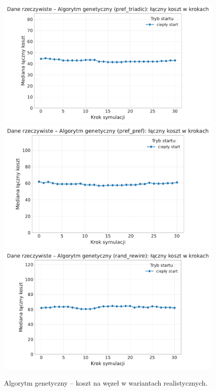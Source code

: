 \begin{figure}[H]
  \centering
  \includegraphics[width=0.62\linewidth]{assets/figures/dynamic/real/real_algorytm_genetyczny_cost_over_steps_pref_triadic.pdf}\\[0.4em]
  \includegraphics[width=0.62\linewidth]{assets/figures/dynamic/real/real_algorytm_genetyczny_cost_over_steps_pref_pref.pdf}\\[0.4em]
  \includegraphics[width=0.62\linewidth]{assets/figures/dynamic/real/real_algorytm_genetyczny_cost_over_steps_rand_rewire.pdf}
  \caption{Algorytm genetyczny -- koszt na węzeł w wariantach realistycznych.}
  \label{fig:dyn-real-genetic-cost}
\end{figure}

